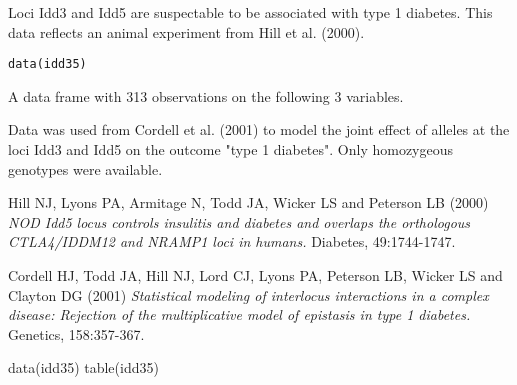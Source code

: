 \begin{Description}\relax
Loci Idd3 and Idd5 are suspectable to be associated with type 1 diabetes.
This data reflects an animal experiment from Hill et al. (2000).
\end{Description}
\begin{Usage}
\begin{verbatim}data(idd35)\end{verbatim}
\end{Usage}
\begin{Format}\relax
A data frame with 313 observations on the following 3 variables.
\end{Format}
\begin{Details}\relax
Data was used from Cordell et al. (2001) to model the joint effect of alleles at
the loci Idd3 and Idd5 on the outcome "type 1 diabetes". Only homozygeous genotypes 
were available.
\end{Details}
\begin{Source}\relax
Hill NJ, Lyons PA, Armitage N, Todd JA, Wicker LS and Peterson LB (2000)
\emph{NOD Idd5 locus controls insulitis and diabetes and overlaps the 
orthologous CTLA4/IDDM12 and NRAMP1 loci in humans.}
Diabetes, 49:1744-1747.
\end{Source}
\begin{References}\relax
Cordell HJ, Todd JA, Hill NJ, Lord CJ, Lyons PA, Peterson LB, Wicker LS and Clayton DG (2001)
\emph{Statistical modeling of interlocus interactions in a complex disease: Rejection
of the multiplicative model of epistasis in type 1 diabetes.}
Genetics, 158:357-367.
\end{References}
\begin{Examples}
\begin{ExampleCode}
  data(idd35)
  table(idd35)
\end{ExampleCode}
\end{Examples}

